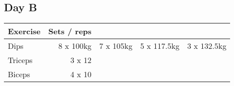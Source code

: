 \documentclass[12pt, a4paper]{article}%
\begin{document}
  \subsection*{\hspace{0.5em} Day B }


  \begin{tabular}{l|rrrr}
  \hspace{0.75em} \textbf{Exercise} & \textbf{Sets / reps} \\ \hline

            \hspace{0.75em} Dips
            & 8 x 100kg
            & 7 x 105kg
            & 5 x 117.5kg
            & 3 x 132.5kg
            \\


   \hspace{0.75em} Triceps & 3 x 12 \\
   \hspace{0.75em} Biceps & 4 x 10 \\
  \end{tabular}
\end{document}
